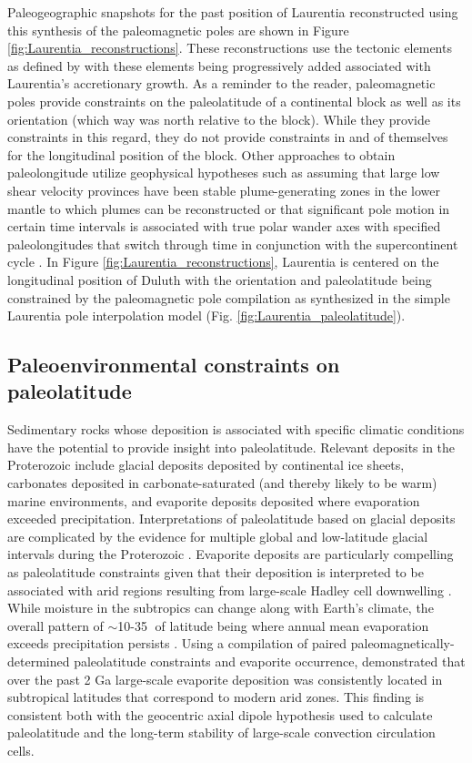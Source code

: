 \documentclass[11pt,letterpaper]{article}
\begin{document}
Paleogeographic snapshots for the past position of Laurentia reconstructed using this synthesis of the paleomagnetic poles are shown in Figure \ref{fig:Laurentia_reconstructions}. These reconstructions use the tectonic elements as defined by \citet{Whitmeyer2007a} with these elements being progressively added associated with Laurentia's accretionary growth. As a reminder to the reader, paleomagnetic poles provide constraints on the paleolatitude of a continental block as well as its orientation (which way was north relative to the block). While they provide constraints in this regard, they do not provide constraints in and of themselves for the longitudinal position of the block. Other approaches to obtain paleolongitude utilize geophysical hypotheses such as assuming that large low shear velocity provinces have been stable plume-generating zones in the lower mantle to which plumes can be reconstructed \citep{Torsvik2014a} or that significant pole motion in certain time intervals is associated with true polar wander axes with specified paleolongitudes that switch through time in conjunction with the supercontinent cycle \citep{Mitchell2012a}. In Figure \ref{fig:Laurentia_reconstructions}, Laurentia is centered on the longitudinal position of Duluth with the orientation and paleolatitude being constrained by the paleomagnetic pole compilation as synthesized in the simple Laurentia pole interpolation model (Fig. \ref{fig:Laurentia_paleolatitude}).

\subsection{Paleoenvironmental constraints on paleolatitude}

Sedimentary rocks whose deposition is associated with specific climatic conditions have the potential to provide insight into paleolatitude. Relevant deposits in the Proterozoic include glacial deposits deposited by continental ice sheets, carbonates deposited in carbonate-saturated (and thereby likely to be warm) marine environments, and evaporite deposits deposited where evaporation exceeded precipitation. Interpretations of paleolatitude based on glacial deposits are complicated by the evidence for multiple global and low-latitude glacial intervals during the Proterozoic \citep{Evans2003a}. Evaporite deposits are particularly compelling as paleolatitude constraints given that their deposition is interpreted to be associated with arid regions resulting from large-scale Hadley cell downwelling \citep{Evans2006a}. While moisture in the subtropics can change along with Earth's climate, the overall pattern of $\sim$10-35\textdegree$\;$ of latitude being where annual mean evaporation exceeds precipitation persists \citep{Burls2017a}. Using a compilation of paired paleomagnetically-determined paleolatitude constraints and evaporite occurrence, \cite{Evans2006a} demonstrated that over the past 2 Ga large-scale evaporite deposition was consistently located in subtropical latitudes that correspond to modern arid zones. This finding is consistent both with the geocentric axial dipole hypothesis used to calculate paleolatitude and the long-term stability of large-scale convection circulation cells. 
\end{document}
